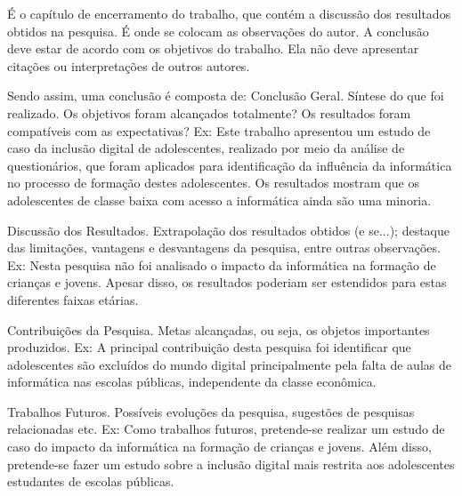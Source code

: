 É o capítulo de encerramento do trabalho, que contém a discussão dos resultados obtidos na pesquisa. É onde se colocam as observações do autor.  A conclusão deve estar de acordo com os objetivos do trabalho. Ela não deve apresentar citações ou interpretações de outros autores.

Sendo assim, uma conclusão é composta de:
	Conclusão Geral. Síntese do que foi realizado. Os objetivos foram alcançados totalmente? Os resultados foram compatíveis com as expectativas?
	Ex: Este trabalho apresentou um estudo de caso da inclusão digital de adolescentes, realizado por meio da análise de questionários, que foram aplicados para identificação da influência da informática no processo de formação destes adolescentes. Os resultados mostram que os adolescentes de classe baixa com acesso a informática ainda são uma minoria.
	
 Discussão dos Resultados. Extrapolação dos resultados obtidos (e se...); destaque das limitações, vantagens e desvantagens da pesquisa, entre outras observações.
	Ex: Nesta pesquisa não foi analisado o impacto da informática na formação de crianças e jovens. Apesar disso, os resultados poderiam ser estendidos para estas diferentes faixas etárias.
	
 Contribuições da Pesquisa. Metas alcançadas, ou seja, os objetos importantes produzidos.
	Ex: A principal contribuição desta pesquisa foi identificar que adolescentes são excluídos do mundo digital principalmente pela falta de aulas de informática nas escolas públicas, independente da classe econômica.
	
 Trabalhos Futuros. Possíveis evoluções da pesquisa, sugestões de pesquisas relacionadas etc.
	Ex: Como trabalhos futuros, pretende-se realizar um estudo de caso do impacto da informática na formação de crianças e jovens. Além disso, pretende-se fazer um estudo sobre a inclusão digital mais restrita aos adolescentes estudantes de escolas públicas.


